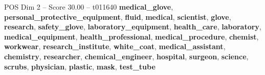 \begin{textsample}{POS Dim 2 – Score 30.00 – t011640}  \label{ex:f2_pos_010}
\textbf{medical\_glove}, \textbf{personal\_protective\_equipment}, \textbf{fluid}, \textbf{medical}, \textbf{scientist}, \textbf{glove}, \textbf{research}, \textbf{safety\_glove}, \textbf{laboratory\_equipment}, \textbf{health\_care}, \textbf{laboratory}, \textbf{medical\_equipment}, \textbf{health\_professional}, \textbf{medical\_procedure}, \textbf{chemist}, \textbf{workwear}, \textbf{research\_institute}, \textbf{white\_coat}, \textbf{medical\_assistant}, \textbf{chemistry}, \textbf{researcher}, \textbf{chemical\_engineer}, \textbf{hospital}, \textbf{surgeon}, \textbf{science}, \textbf{scrubs}, \textbf{physician}, \textbf{plastic}, \textbf{mask}, \textbf{test\_tube}

\end{textsample}
